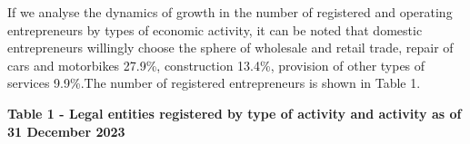 If we analyse the dynamics of growth in the number of registered and
operating entrepreneurs by types of economic activity, it can be noted
that domestic entrepreneurs willingly choose the sphere of wholesale and
retail trade, repair of cars and motorbikes 27.9\%, construction 13.4\%,
provision of other types of services 9.9\%.The number of registered
entrepreneurs is shown in Table 1.

{\bfseries Table 1 - Legal entities registered by type of activity and
activity as of 31 December 2023}

